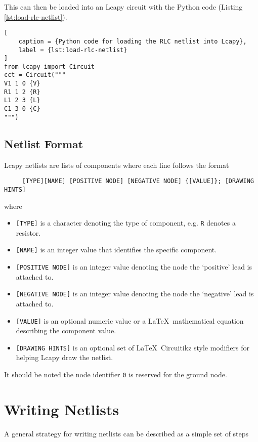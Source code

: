\documentclass{article}
\begin{document}
This can then be loaded into an Lcapy circuit with the Python code (Listing \ref{lst:load-rlc-netlist}).

\begin{lstlisting}[
    caption = {Python code for loading the RLC netlist into Lcapy},
    label = {lst:load-rlc-netlist}
]
from lcapy import Circuit 
cct = Circuit("""
V1 1 0 {V}
R1 1 2 {R}
L1 2 3 {L}
C1 3 0 {C}
""")
\end{lstlisting}

\subsection*{Netlist Format}

Lcapy netlists are lists of components where each line follows the format

\texttt{
\ \ \ \ [TYPE][NAME] [POSITIVE NODE] [NEGATIVE NODE] \{[VALUE]\}; [DRAWING HINTS]
}

where 

\begin{itemize}
    \item[] \texttt{[TYPE]} is a character denoting the type of component, e.g. \texttt{R} denotes a resistor.
    \item[] \texttt{[NAME]} is an integer value that identifies the specific component.
    \item[] \texttt{[POSITIVE NODE]} is an integer value denoting the node the `positive' lead is attached to.
    \item[] \texttt{[NEGATIVE NODE]} is an integer value denoting the node the `negative' lead is attached to.
    \item[] \texttt{[VALUE]} is an optional numeric value or a \LaTeX\ mathematical equation describing the component value.
    \item[] \texttt{[DRAWING HINTS]} is an optional set of \LaTeX\ Circuitikz style modifiers for helping Lcapy draw the netlist.
\end{itemize}
    
It should be noted the node identifier \texttt{0} is reserved for the ground node.

\section*{Writing Netlists}

A general strategy for writing netlists can be described as a simple set of steps 
\end{document}
